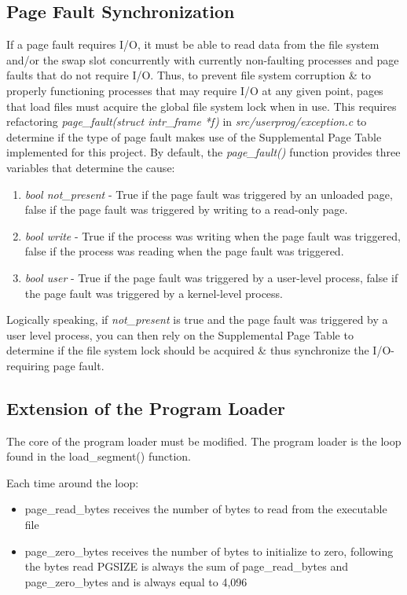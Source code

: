 \documentclass[11pt, letterpaper]{article}
\begin{document}
\subsection{Page Fault Synchronization}
	If a page fault requires I/O, it must be able to read data from the file system and/or the swap slot concurrently with currently non-faulting processes and page faults that do not require I/O. Thus, to prevent file system corruption \& to properly functioning processes that may require I/O at any given point, pages that load files must acquire the global file system lock when in use. This requires refactoring \emph{page\_fault(struct intr\_frame *f)} in \emph{src/userprog/exception.c} to determine if the type of page fault makes use of the Supplemental Page Table implemented for this project. By default, the \emph{page\_fault()} function provides three variables that determine the cause:
	\begin{enumerate}
		\item \emph{bool not\_present} - True if the page fault was triggered by an unloaded page, false if the page fault was triggered by writing to a read-only page.
		\item \emph{bool write} - True if the process was writing when the page fault was triggered, false if the process was reading when the page fault was triggered.
		\item \emph{bool user} - True if the page fault was triggered by a user-level process, false if the page fault was triggered by a kernel-level process.
	\end{enumerate}
	Logically speaking, if \emph{not\_present} is true and the page fault was triggered by a user level process, you can then rely on the Supplemental Page Table to determine if the file system lock should be acquired \& thus synchronize the I/O-requiring page fault.
\subsection{Extension of the Program Loader}
The core of the program loader must be modified. The program loader is the loop found in the load\_segment() function. 

Each time around the loop:
\begin{itemize}
\item page\_read\_bytes receives the number of bytes to read from the executable file
\item page\_zero\_bytes receives the number of bytes to initialize to zero, following the bytes read
PGSIZE is always the sum of page\_read\_bytes and page\_zero\_bytes and is always equal to 4,096 
\end{itemize}
\end{document}

